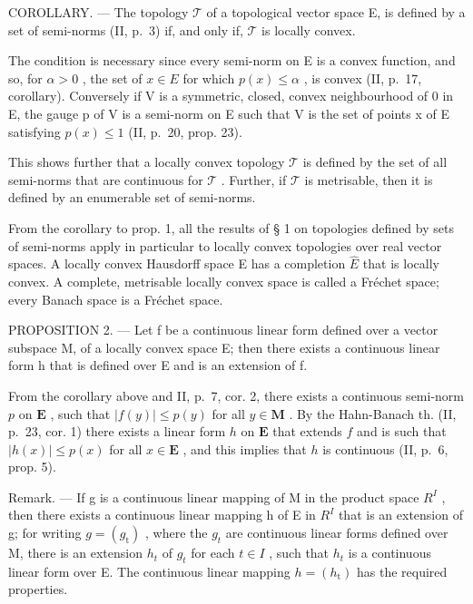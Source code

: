 COROLLARY. --- The topology \(\mathcal{T}\) of a topological vector space E, is defined by a set of semi-norms (II, p.~3) if, and only if, \(\mathcal{T}\) is locally convex.

The condition is necessary since every semi-norm on E is a convex function, and so, for \(\alpha > 0\) , the set of \(x \in E\) for which \(p(x) \leqslant \alpha\) , is convex (II, p.~17, corollary). Conversely if V is a symmetric, closed, convex neighbourhood of 0 in E, the gauge p of V is a semi-norm on E such that V is the set of points x of E satisfying \(p(x) \leqslant 1\) (II, p.~20, prop. 23).

This shows further that a locally convex topology \(\mathcal{T}\) is defined by the set of all semi-norms that are continuous for \(\mathcal{T}\) . Further, if \(\mathcal{T}\) is metrisable, then it is defined by an enumerable set of semi-norms.

From the corollary to prop. 1, all the results of § 1 on topologies defined by sets of semi-norms apply in particular to locally convex topologies over real vector spaces. A locally convex Hausdorff space E has a completion \(\hat{E}\) that is locally convex. A complete, metrisable locally convex space is called a Fréchet space; every Banach space is a Fréchet space.

PROPOSITION 2. --- Let f be a continuous linear form defined over a vector subspace M, of a locally convex space E; then there exists a continuous linear form h that is defined over E and is an extension of f.

From the corollary above and II, p.~7, cor. 2, there exists a continuous semi-norm \(p\) on \(\mathbf{E}\) , such that \(|f(y)| \leqslant p(y)\) for all \(y \in \mathbf{M}\) . By the Hahn-Banach th. (II, p.~23, cor. 1) there exists a linear form \(h\) on \(\mathbf{E}\) that extends \(f\) and is such that \(|h(x)| \leqslant p(x)\) for all \(x \in \mathbf{E}\) , and this implies that \(h\) is continuous (II, p.~6, prop. 5).

Remark. --- If g is a continuous linear mapping of M in the product space \(R^{I}\) , then there exists a continuous linear mapping h of E in \(R^{I}\) that is an extension of g; for writing \(g = (g_{\mathrm{t}})\) , where the \(g_{t}\) are continuous linear forms defined over M, there is an extension \(h_{t}\) of \(g_{t}\) for each \(t \in I\) , such that \(h_{t}\) is a continuous linear form over E. The continuous linear mapping \(h = (h_{\mathrm{t}})\) has the required properties.

